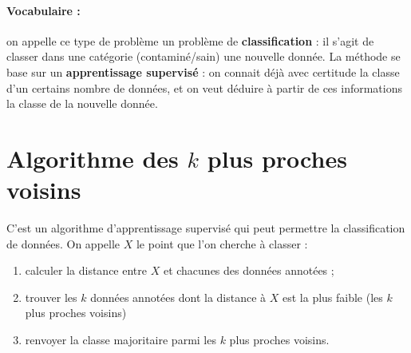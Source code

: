 \documentclass[12pt]{article}                   %
\theoremstyle{exercicestyle}
\theoremstyle{break2}
\theoremstyle{break3}
\begin{document}

\paragraph{Vocabulaire :} on appelle ce type de problème un problème de \textbf{classification} : il s'agit de classer dans une catégorie (contaminé/sain) une nouvelle donnée. La méthode se base sur un \textbf{apprentissage supervisé} : on connait déjà avec certitude la classe d'un certains nombre de données, et on veut déduire à partir de ces informations la classe de la nouvelle donnée. 

\section{Algorithme des $k$ plus proches voisins}

\begin{definition}
    
C'est un algorithme d'apprentissage supervisé qui peut permettre la classification de données. On appelle $X$ le point que l'on cherche à classer :
\begin{enumerate}
    \item calculer la distance entre $X$ et chacunes des données annotées ;
    \item trouver les $k$ données annotées dont la distance à $X$ est la plus faible (les $k$ plus proches voisins)
    \item renvoyer la classe majoritaire parmi les $k$ plus proches voisins.
\end{enumerate}
\end{definition} 
\end{document}
